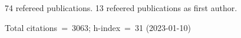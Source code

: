74 refereed publications. 13 refeered publications as first author.

Total citations~=~3063; h-index~=~31 (2023-01-10)